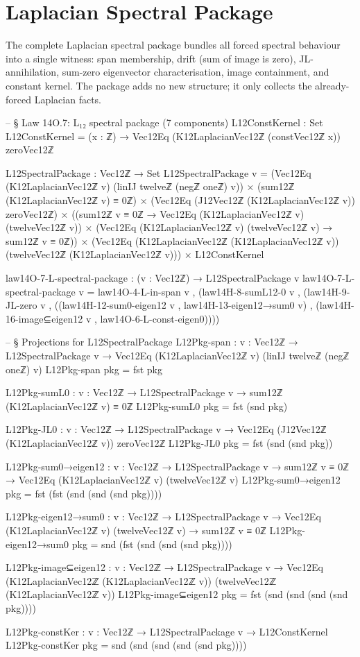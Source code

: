 \documentclass[11pt,a4paper]{book}
\begin{document}
\section{Laplacian Spectral Package}

The complete Laplacian spectral package bundles all forced spectral
behaviour into a single witness: span membership, drift
(sum of image is zero), JL-annihilation, sum-zero eigenvector
characterisation, image containment, and constant kernel.  The package adds no
new structure; it only collects the already-forced Laplacian facts.

\begin{code}
-- § Law 14O.7: L₁₂ spectral package (7 components)
L12ConstKernel : Set
L12ConstKernel = (x : ℤ) → Vec12Eq (K12LaplacianVec12ℤ (constVec12ℤ x)) zeroVec12ℤ

L12SpectralPackage : Vec12ℤ → Set
L12SpectralPackage v =
  (Vec12Eq (K12LaplacianVec12ℤ v) (linIJ twelveℤ (negℤ oneℤ) v)) ×
  (sum12ℤ (K12LaplacianVec12ℤ v) ≡ 0ℤ) ×
  (Vec12Eq (J12Vec12ℤ (K12LaplacianVec12ℤ v)) zeroVec12ℤ) ×
  ((sum12ℤ v ≡ 0ℤ → Vec12Eq (K12LaplacianVec12ℤ v) (twelveVec12ℤ v)) ×
   (Vec12Eq (K12LaplacianVec12ℤ v) (twelveVec12ℤ v) → sum12ℤ v ≡ 0ℤ)) ×
  (Vec12Eq (K12LaplacianVec12ℤ (K12LaplacianVec12ℤ v))
          (twelveVec12ℤ (K12LaplacianVec12ℤ v))) ×
  L12ConstKernel

law14O-7-L-spectral-package : (v : Vec12ℤ) → L12SpectralPackage v
law14O-7-L-spectral-package v =
  law14O-4-L-in-span v ,
  (law14H-8-sumL12-0 v ,
   (law14H-9-JL-zero v ,
    ((law14H-12-sum0-eigen12 v , law14H-13-eigen12→sum0 v) ,
     (law14H-16-image⊆eigen12 v ,
      law14O-6-L-const-eigen0))))

-- § Projections for L12SpectralPackage
L12Pkg-span : {v : Vec12ℤ} → L12SpectralPackage v → Vec12Eq (K12LaplacianVec12ℤ v) (linIJ twelveℤ (negℤ oneℤ) v)
L12Pkg-span pkg = fst pkg

L12Pkg-sumL0 : {v : Vec12ℤ} → L12SpectralPackage v → sum12ℤ (K12LaplacianVec12ℤ v) ≡ 0ℤ
L12Pkg-sumL0 pkg = fst (snd pkg)

L12Pkg-JL0 : {v : Vec12ℤ} → L12SpectralPackage v → Vec12Eq (J12Vec12ℤ (K12LaplacianVec12ℤ v)) zeroVec12ℤ
L12Pkg-JL0 pkg = fst (snd (snd pkg))

L12Pkg-sum0→eigen12 : {v : Vec12ℤ} → L12SpectralPackage v → sum12ℤ v ≡ 0ℤ → Vec12Eq (K12LaplacianVec12ℤ v) (twelveVec12ℤ v)
L12Pkg-sum0→eigen12 pkg = fst (fst (snd (snd (snd pkg))))

L12Pkg-eigen12→sum0 : {v : Vec12ℤ} → L12SpectralPackage v → Vec12Eq (K12LaplacianVec12ℤ v) (twelveVec12ℤ v) → sum12ℤ v ≡ 0ℤ
L12Pkg-eigen12→sum0 pkg = snd (fst (snd (snd (snd pkg))))

L12Pkg-image⊆eigen12 : {v : Vec12ℤ} → L12SpectralPackage v →
  Vec12Eq (K12LaplacianVec12ℤ (K12LaplacianVec12ℤ v)) (twelveVec12ℤ (K12LaplacianVec12ℤ v))
L12Pkg-image⊆eigen12 pkg = fst (snd (snd (snd (snd pkg))))

L12Pkg-constKer : {v : Vec12ℤ} → L12SpectralPackage v → L12ConstKernel
L12Pkg-constKer pkg = snd (snd (snd (snd (snd pkg))))
\end{code}
\end{document}

